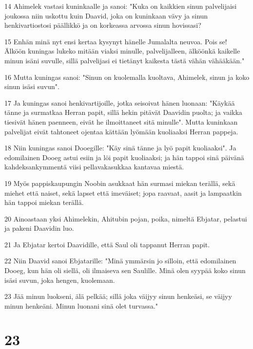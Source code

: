 \par 14 Ahimelek vastasi kuninkaalle ja sanoi: "Kuka on kaikkien sinun palvelijaisi joukossa niin uskottu kuin Daavid, joka on kuninkaan vävy ja sinun henkivartiostosi päällikkö ja on korkeassa arvossa sinun hovissasi?
\par 15 Enhän minä nyt ensi kertaa kysynyt hänelle Jumalalta neuvoa. Pois se! Älköön kuningas lukeko mitään viaksi minulle, palvelijalleen, älköönkä kaikelle minun isäni suvulle, sillä palvelijasi ei tietänyt kaikesta tästä vähän vähääkään."
\par 16 Mutta kuningas sanoi: "Sinun on kuolemalla kuoltava, Ahimelek, sinun ja koko sinun isäsi suvun".
\par 17 Ja kuningas sanoi henkivartijoille, jotka seisoivat hänen luonaan: "Käykää tänne ja surmatkaa Herran papit, sillä hekin pitävät Daavidin puolta; ja vaikka tiesivät hänen paenneen, eivät he ilmoittaneet sitä minulle". Mutta kuninkaan palvelijat eivät tahtoneet ojentaa kättään lyömään kuoliaaksi Herran pappeja.
\par 18 Niin kuningas sanoi Dooegille: "Käy sinä tänne ja lyö papit kuoliaaksi". Ja edomilainen Dooeg astui esiin ja löi papit kuoliaaksi; ja hän tappoi sinä päivänä kahdeksankymmentä viisi pellavakasukkaa kantavaa miestä.
\par 19 Myös pappiskaupungin Noobin asukkaat hän surmasi miekan terällä, sekä miehet että naiset, sekä lapset että imeväiset; jopa raavaat, aasit ja lampaatkin hän tappoi miekan terällä.
\par 20 Ainoastaan yksi Ahimelekin, Ahitubin pojan, poika, nimeltä Ebjatar, pelastui ja pakeni Daavidin luo.
\par 21 Ja Ebjatar kertoi Daavidille, että Saul oli tappanut Herran papit.
\par 22 Niin Daavid sanoi Ebjatarille: "Minä ymmärsin jo silloin, että edomilainen Dooeg, kun hän oli siellä, oli ilmaiseva sen Saulille. Minä olen syypää koko sinun isäsi suvun, joka hengen, kuolemaan.
\par 23 Jää minun luokseni, älä pelkää; sillä joka väijyy sinun henkeäsi, se väijyy minun henkeäni. Minun luonani sinä olet turvassa."

\chapter{23}

